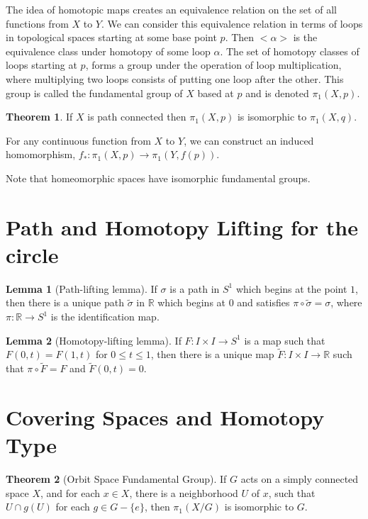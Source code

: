 \documentclass{article}
\theoremstyle{definition}
\newtheorem{lemma}{Lemma}[section]
\newtheorem{theorem}{Theorem}[section]
\theoremstyle{remark}
\theoremstyle{remark}
\def\reals{{\mathbb R}}
\begin{document}
The idea of homotopic maps creates an equivalence relation on the set of all functions from $X$ to $Y$. We can consider this equivalence relation in terms of loops in topological spaces starting at some base point $p$. Then $<\alpha>$ is the equivalence class under homotopy of some loop $\alpha$. The set of homotopy classes of loops starting at $p$, forms a group under the operation of loop multiplication, where multiplying two loops consists of putting one loop after the other. This group is called the fundamental group of $X$ based at $p$ and is denoted $\pi_1(X, p)$.

\begin{theorem}
    If $X$ is path connected then $\pi_1(X, p)$ is isomorphic to $\pi_1(X, q)$.
\end{theorem}

For any continuous function from $X$ to $Y$, we can construct an induced homomorphism, $f_{*}: \pi_1(X, p) \to \pi_1(Y, f(p))$.

Note that homeomorphic spaces have isomorphic fundamental groups.

\section{Path and Homotopy Lifting for the circle}

\begin{lemma}[Path-lifting lemma]
    If $\sigma$ is a path in $S^1$ which begins at the point $1$, then there is a unique path $\tilde{\sigma}$ in $\reals$ which begins at $0$ and satisfies $\pi \circ \tilde{\sigma} = \sigma$, where $\pi: \reals \to S^1$ is the identification map.
\end{lemma}

\begin{lemma}[Homotopy-lifting lemma]
    If $F: I \times I \to S^1$ is a map such that $F(0, t) = F(1, t)$ for $0 \leq t \leq 1$, then there is a unique map $\tilde{F}: I \times I \to \reals$ such that $\pi \circ \tilde{F} = F$ and $\tilde{F}(0, t) = 0$. 
\end{lemma}

\section{Covering Spaces and Homotopy Type}

\begin{theorem}[Orbit Space Fundamental Group]
    If $G$ acts on a simply connected space $X$, and for each $x \in X$, there is a neighborhood $U$ of $x$, such that $U \cap g(U)$ for each $g\in G - \{e\}$, then $\pi_1(X/G)$ is isomorphic to $G$.
\end{theorem}
\end{document}
